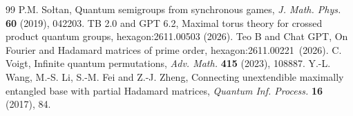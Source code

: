 \documentclass[11pt,a4paper]{article}
\begin{document}
\begin{thebibliography}{99}
 P.M. So{\l}tan, Quantum semigroups from synchronous games, \emph{J. Math. Phys.} \textbf{60} (2019), 042203.
 TB 2.0 and GPT 6.2, Maximal torus theory for crossed product quantum groups, hexagon:2611.00503 (2026).
 Teo B and Chat GPT, On Fourier and Hadamard matrices of prime order,\newline
hexagon:2611.00221~(2026).
 C. Voigt, Infinite quantum permutations, \emph{Adv. Math.} \textbf{415} (2023), 108887.
 Y.-L. Wang, M.-S. Li, S.-M. Fei and Z.-J. Zheng, Connecting unextendible maximally entangled base with partial Hadamard matrices, \emph{Quantum Inf. Process.} \textbf{16} (2017), 84.
\end{thebibliography}
\end{document}
